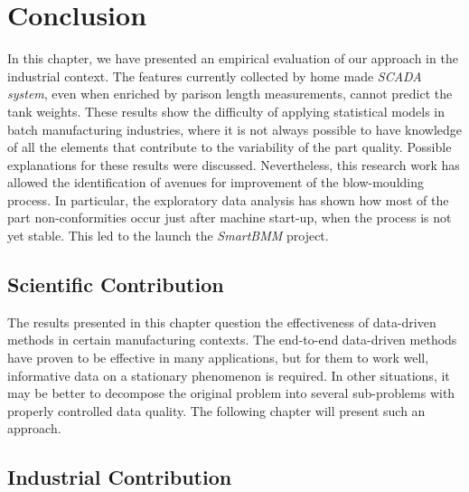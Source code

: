 \section{Conclusion}

In this chapter, we have presented an empirical evaluation of our approach in the industrial context. The features currently collected by home made \textit{SCADA system}, even when enriched by parison length measurements, cannot predict the tank weights. These results show the difficulty of applying statistical models in batch manufacturing industries, where it is not always possible to have knowledge of all the elements that contribute to the variability of the part quality. Possible explanations for these results were discussed. Nevertheless, this research work has allowed the identification of avenues for improvement of the blow-moulding process. In particular, the exploratory data analysis has shown how most of the part non-conformities occur just after machine start-up, when the process is not yet stable. This led to the launch the \textit{SmartBMM} project.

\subsection{Scientific Contribution}

The results presented in this chapter question the effectiveness of data-driven methods in certain manufacturing contexts. The end-to-end data-driven methods have proven to be effective in many applications, but for them to work well, informative data on a stationary phenomenon is required. In other situations, it may be better to decompose the original problem into several sub-problems with properly controlled data quality. The following chapter will present such an approach.

\subsection{Industrial Contribution}

